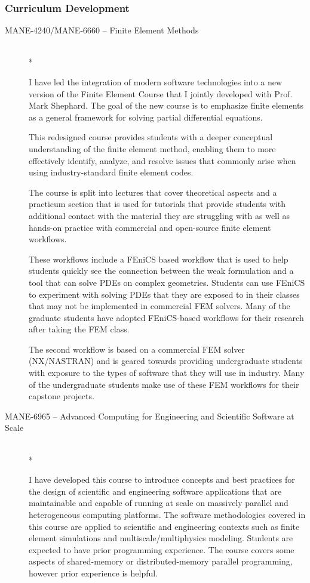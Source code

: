 \subsubsection{Curriculum Development}
\begin{description}


\item[MANE-4240/MANE-6660 -- Finite Element Methods]\mbox{}\\*

I have led the integration of modern software technologies into a new version of the Finite Element Course that I jointly developed with Prof. Mark Shephard. The goal of the new course is to emphasize finite elements as a general framework for solving partial differential equations.

This redesigned course provides students with a deeper conceptual understanding of the finite element method, enabling them to more effectively identify, analyze, and resolve issues that commonly arise when using industry-standard finite element codes.

The course is split into lectures that cover theoretical aspects and a practicum section that is used for tutorials that provide students with additional contact with the material they are struggling with as well as hands-on practice with commercial and open-source finite element workflows.

These workflows include a FEniCS based workflow that is used to help students quickly see the connection between the weak formulation and a tool that can solve PDEs on complex geometries. Students can use FEniCS to experiment with solving PDEs that they are exposed to in their classes that may not be implemented in commercial FEM solvers. Many of the graduate students have adopted FEniCS-based workflows for their research after taking the FEM class.

The second workflow is based on a commercial FEM solver (NX/NASTRAN) and is geared towards providing undergraduate students with exposure to the types of software that they will use in industry. Many of the undergraduate students make use of these FEM workflows for their capstone projects.

\item[MANE-6965 -- Advanced Computing for Engineering and Scientific Software at Scale]\mbox{}\\*

I have developed this course to introduce concepts and best practices for the design of scientific and engineering software applications that are maintainable and capable of running at scale on massively parallel and heterogeneous computing platforms. The software methodologies covered in this course are applied to scientific and engineering contexts such as finite element simulations and multiscale/multiphysics modeling. Students are expected to have prior programming experience. The course covers some aspects of shared-memory or distributed-memory parallel programming, however prior experience is helpful.


\end{description}

